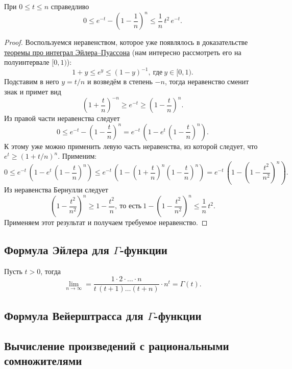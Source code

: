\begin{lemma}
	При \(0 \leqslant t \leqslant n\) справедливо \[
		0 \leqslant e^{-t} - \left(1 - \frac{1}{n} \right)^n \leqslant \frac{1}{n} \, t^2 \, e^{-t}.
	\]
\end{lemma}
\begin{proof}
	Воспользуемся неравенством, которое уже появлялось в доказательстве \hyperlink{puas}{теоремы про интеграл Эйлера--Пуассона} (нам интересно рассмотреть его на полуинтервале \([0, 1)\)): \[
		1 + y \leqslant e^y \leqslant (1 - y)^{-1}, \ \text{где} \ y \in [0, 1).
	\]
	Подставим в него \(y = t/n\) и возведём в степень \(-n\), тогда неравенство сменит знак и примет вид \[
		\left(1 + \frac{t}{n} \right)^{-n} \geqslant e^{-t} \geqslant \left(1 - \frac{t}{n} \right)^n.
	\]
	Из правой части неравенства следует \[
		0 \leqslant e^{-t} - \left(1 - \frac{t}{n} \right)^n = e^{-t} \, \left(1 - e^t \, \left(1 - \frac{t}{n} \right)^n \right).
	\]
	К этому уже можно применить левую часть неравенства, из которой следует, что \(e^t \geqslant (1 + t/n)^n\). Применим: \[
		0 \leqslant e^{-t} \, \left(1 - e^t \, \left(1 - \frac{t}{n} \right)^n \right) \leqslant e^{-t} \, \left(1 - \left(1 + \frac{t}{n} \right)^n \left(1 - \frac{t}{n} \right)^n \right) = e^{-t} \, \left(1 - \left(1 - \frac{t^2}{n^2} \right)^n \right).
	\]
	Из неравенства Бернулли следует \[
		\left(1 - \frac{t^2}{n^2} \right)^n \geqslant 1 - \frac{t^2}{n}, \ \text{то есть} \ 1 - \left(1 - \frac{t^2}{n^2} \right)^n \leqslant \frac{1}{n} \, t^2.
	\]
	Применяем этот результат и получаем требуемое неравенство.
\end{proof}

\subsection{\color{red} Формула Эйлера для \(\Gamma\)-функции}

\begin{theorem}
	Пусть \(t > 0\), тогда \[
		\lim_{n \to \infty} = \frac{1 \cdot 2 \cdot \ldots \cdot n}{t \, (t+1) \ldots (t+n)} \cdot n^t = \Gamma(t).
	\]
\end{theorem}

\subsection{\color{red} Формула Вейерштрасса для \(\Gamma\)-функции}

\subsection{\color{red} Вычисление произведений с рациональными сомножителями}

